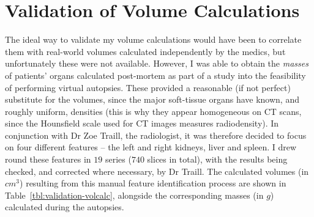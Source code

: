 


\afterpage{\clearpage}
\newpage

\section{Validation of Volume Calculations}


The ideal way to validate my volume calculations would have been to correlate them with real-world volumes calculated independently by the medics, but unfortunately these were not available. However, I was able to obtain the \emph{masses} of patients' organs calculated post-mortem as part of a study into the feasibility of performing virtual autopsies. These provided a reasonable (if not perfect) substitute for the volumes, since the major soft-tissue organs have known, and roughly uniform, densities (this is why they appear homogeneous on CT scans, since the Hounsfield scale used for CT images measures radiodensity). In conjunction with Dr Zoe Traill, the radiologist, it was therefore decided to focus on four different features -- the left and right kidneys, liver and spleen. I drew round these features in $19$ series ($740$ slices in total), with the results being checked, and corrected where necessary, by Dr Traill. The calculated volumes (in $\mathit{cm}^3$) resulting from this manual feature identification process are shown in Table~\ref{tbl:validation-volcalc}, alongside the corresponding masses (in $g$) calculated during the autopsies.

